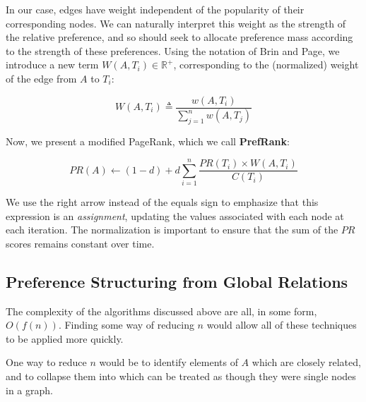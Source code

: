 In our case, edges have weight independent of the popularity of their corresponding nodes.
We can naturally interpret this weight as the strength of the relative preference, and so should seek to allocate preference mass according to the strength of these preferences.
Using the notation of Brin and Page, we introduce a new term $W(A, T_i) \in \mathbb{R}^+$, corresponding to the (normalized) weight of the edge from $A$ to $T_i$:

\[
W(A, T_i) \triangleq \frac{w(A, T_i)}{\sum_{j=1}^n w(A, T_j)}
\]

Now, we present a modified PageRank, which we call \textbf{PrefRank}:

\[
PR(A) \leftarrow (1-d) + d \sum_{i=1}^n \frac{PR(T_i) \times W(A,T_i)}{C(T_i)}
\]

We use the right arrow instead of the equals sign to emphasize that this expression is an \textit{assignment}, updating the values associated with each node at each iteration.
The normalization is important to ensure that the sum of the $PR$ scores remains constant over time.


\subsection{Preference Structuring from Global Relations}

The complexity of the algorithms discussed above are all, in some form, $O(f(n))$.
Finding some way of reducing $n$ would allow all of these techniques to be applied more quickly.

One way to reduce $n$ would be to identify elements of $A$ which are closely related, and to collapse them into  which can be treated as though they were single nodes in a graph.
